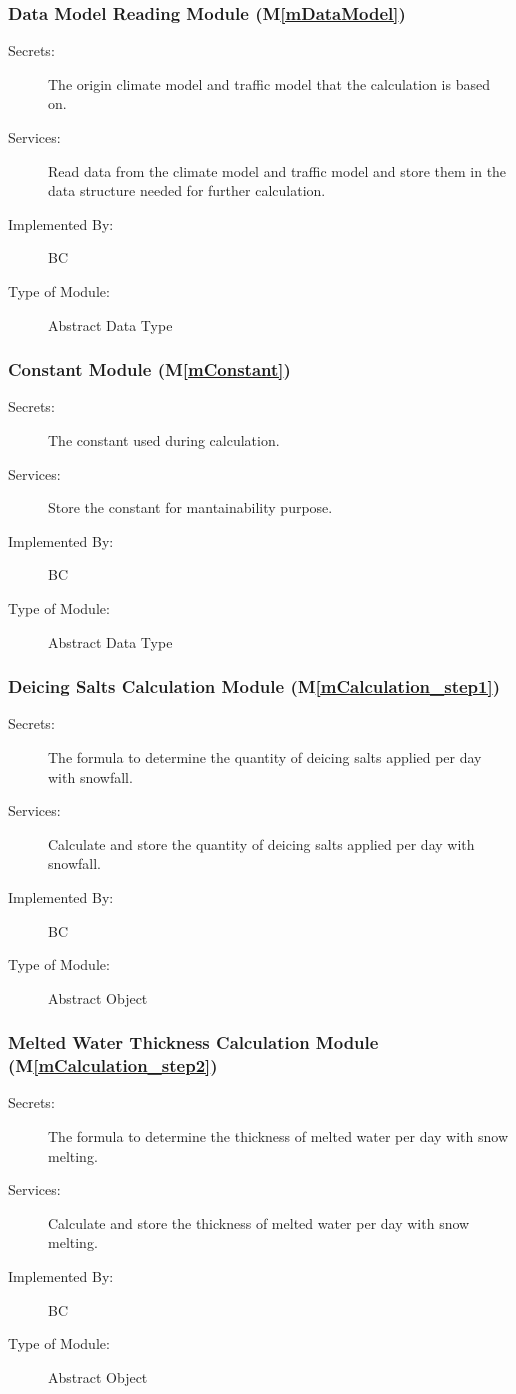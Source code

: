 \documentclass[12pt, titlepage]{article}
\newcommand{\mref}[1]{M\ref{#1}}
\begin{document}
\subsubsection{Data Model Reading Module (\mref{mDataModel})}
\begin{description}
\item[Secrets:] The origin climate model and traffic model that the calculation is based on.
\item[Services:]  Read data from the climate model and traffic model and store them in the data structure needed for further calculation.
\item[Implemented By:] BC
\item[Type of Module:] Abstract Data Type
\end{description}


\subsubsection{Constant Module (\mref{mConstant})}
\begin{description}
\item[Secrets:] The constant used during calculation.
\item[Services:] Store the constant for mantainability purpose.
\item[Implemented By:] BC
\item[Type of Module:] Abstract Data Type
\end{description}

\subsubsection{Deicing Salts Calculation Module (\mref{mCalculation_step1})}
\begin{description}
\item[Secrets:] The formula to determine the quantity of deicing salts applied per day with snowfall.
\item[Services:] Calculate and store the quantity of deicing salts applied per day with snowfall.
\item[Implemented By:] BC
\item[Type of Module:] Abstract Object
\end{description}

\subsubsection{Melted Water Thickness Calculation Module (\mref{mCalculation_step2})}
\begin{description}
\item[Secrets:] The formula to determine the thickness of melted water per day with snow melting.
\item[Services:] Calculate and store the thickness of melted water per day with snow melting.
\item[Implemented By:] BC
\item[Type of Module:] Abstract Object
\end{description}
\end{document}
